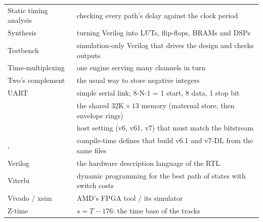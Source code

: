 \documentclass[11pt]{article}
\newcommand{\mods}[1]{\texttt{\detokenize{#1}}}   %
\begin{document}
\begin{longtable}{@{}p{3.6cm}p{11.6cm}@{}}
Static timing analysis & checking every path's delay against the clock period \\
Synthesis & turning Verilog into LUTs, flip-flops, BRAMs and DSPs \\
Testbench & simulation-only Verilog that drives the design and checks outputs \\
Time-multiplexing & one engine serving many channels in turn \\
Two's complement & the usual way to store negative integers \\
UART & simple serial link; 8-N-1 = 1 start, 8 data, 1 stop bit \\
\mods{umem} & the shared $32\text{K}\times13$ memory (maternal store, then envelope rings) \\
\mods{V6_VARIANT} & host setting (v6, v61, v7) that must match the bitstream \\
\mods{V61}, \mods{V7} & compile-time defines that build v6.1 and v7-DL from the same files \\
Verilog & the hardware description language of the RTL \\
Viterbi & dynamic programming for the best path of states with switch costs \\
Vivado / xsim & AMD's FPGA tool / its simulator \\
Z-time & $s = T - 176$: the time base of the tracks \\
\bottomrule
\end{longtable}
\end{document}
